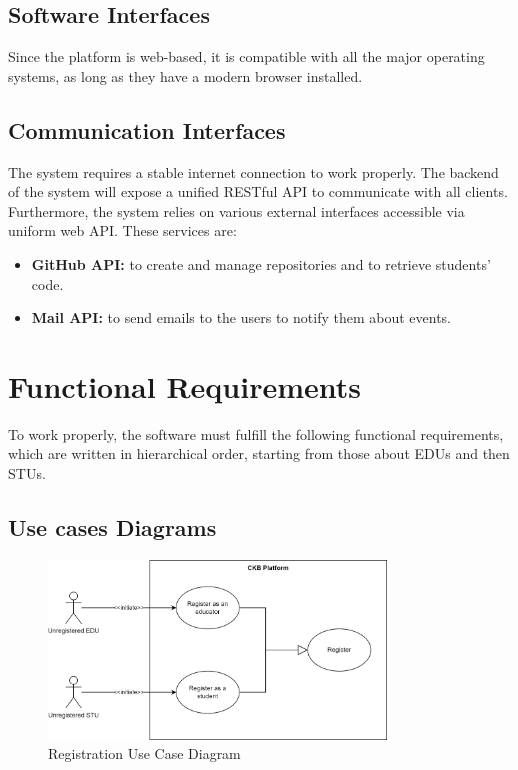 \subsection{Software Interfaces}
Since the platform is web-based, it is compatible with all the major operating systems, as long as they have a modern browser installed.

\subsection{Communication Interfaces}
The system requires a stable internet connection to work properly.
The backend of the system will expose a unified RESTful API to communicate with all clients.\\
Furthermore, the system relies on various external interfaces accessible via uniform web API.
These services are:
\begin{itemize}
    \item \textbf{GitHub API:} to create and manage repositories and to retrieve students' code.
    \item \textbf{Mail API:} to send emails to the users to notify them about events.
\end{itemize}

\section{Functional Requirements}
To work properly, the software must fulfill the following functional requirements, which are written in hierarchical order, starting from those about EDUs and then STUs.

\subsection{Use cases Diagrams}
\begin{figure}[H]
    \centering
    \includegraphics[width=0.8\textwidth]{images/sequence_diagrams/use_case_diagrams_registration.png}
    \caption{Registration Use Case Diagram}
\end{figure}

